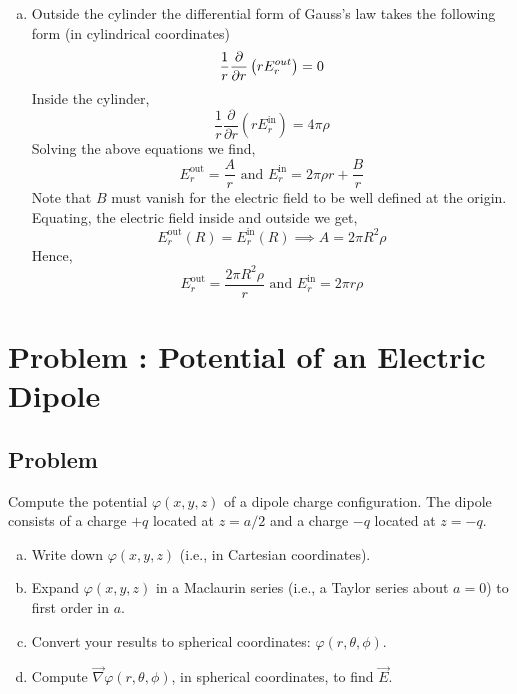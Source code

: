 \documentclass[solutions]{esg8022pset}
\newcommand{\dr}{\frac{\partial}{\partial r}}
\begin{document}
\begin{enumerate}[(a)]
    \item Outside the cylinder the differential form of Gauss's law takes the following form (in cylindrical coordinates)
      $$\frac{1}{r} \frac{\partial}{\partial r} \left( r E^{\mbox{\tiny out}}_r \right)  = 0$$
      Inside the cylinder,
      $$\frac{1}{r} \dr \left( r E^{\text{in}}_r \right)  = 4 \pi \rho$$
      Solving the above equations we find,
      $$E^{\text{out}}_r = \frac{A}{r}\mbox{ and }E^{\text{in}}_r = 2\pi \rho r + \frac{B}{r}$$
      Note that $B$ must vanish for the electric field to be well defined at the origin. Equating, the electric field inside and outside we get,
      $$E^{\text{out}}_r(R) = E^{\text{in}}_r(R) \implies A = 2\pi R^2 \rho$$
      Hence,
      $$E^{\text{out}}_r = \frac{2\pi R^2 \rho}{r} \text{ and } E^{\text{in}}_r=2\pi r \rho$$
  \end{enumerate}
\section{Problem \thesection: Potential of an Electric Dipole}
\subsection{Problem}
  Compute the potential $\varphi(x,y,z)$ of a dipole charge configuration.  The dipole consists of a charge $+q$ located at $z = a/2$ and a charge $-q$ located at $z=-q$.
  \begin{enumerate}[(a)]
    \item Write down $\varphi(x,y,z)$ (i.e., in Cartesian coordinates).
    \item Expand $\varphi(x,y,z)$ in a Maclaurin series (i.e., a Taylor series about $a=0$) to first order in $a$.
    \item Convert your results to spherical coordinates: $\varphi(r, \theta, \phi)$.
    \item Compute $\vec{\nabla}\varphi(r, \theta, \phi)$, in spherical coordinates, to find $\vec{E}$. %
  \end{enumerate}
\end{document}
